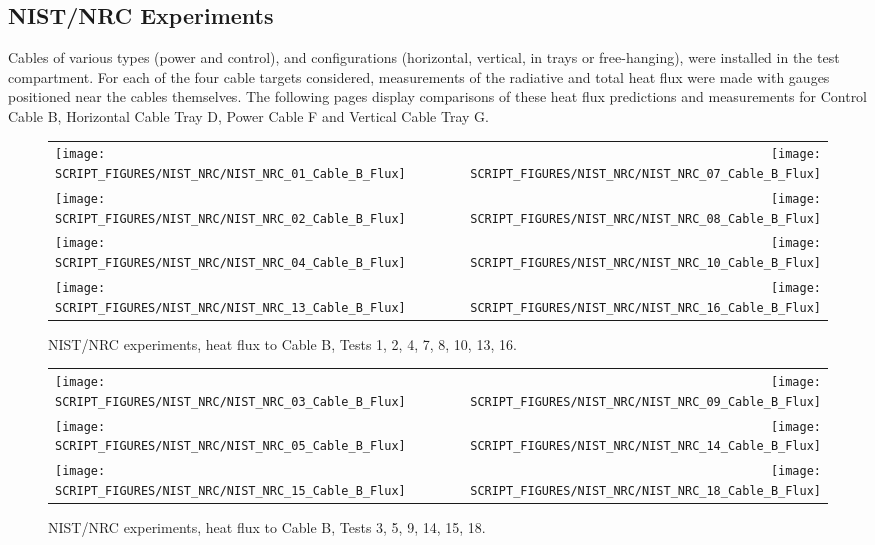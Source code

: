 \clearpage

\subsection{NIST/NRC Experiments}

Cables of various types (power and control), and configurations (horizontal, vertical, in trays or free-hanging), were installed in the test compartment. For each of the four cable targets considered, measurements of the radiative and total heat flux were made with gauges positioned near the cables themselves.  The following pages display comparisons of these heat flux predictions and measurements for Control Cable B, Horizontal Cable Tray D, Power Cable F and Vertical Cable Tray G.

\newpage

\begin{figure}[p]
\begin{tabular*}{\textwidth}{l@{\extracolsep{\fill}}r}
\texttt{[image: SCRIPT\_FIGURES/NIST\_NRC/NIST\_NRC\_01\_Cable\_B\_Flux]} &
\texttt{[image: SCRIPT\_FIGURES/NIST\_NRC/NIST\_NRC\_07\_Cable\_B\_Flux]} \\
\texttt{[image: SCRIPT\_FIGURES/NIST\_NRC/NIST\_NRC\_02\_Cable\_B\_Flux]} &
\texttt{[image: SCRIPT\_FIGURES/NIST\_NRC/NIST\_NRC\_08\_Cable\_B\_Flux]} \\
\texttt{[image: SCRIPT\_FIGURES/NIST\_NRC/NIST\_NRC\_04\_Cable\_B\_Flux]} &
\texttt{[image: SCRIPT\_FIGURES/NIST\_NRC/NIST\_NRC\_10\_Cable\_B\_Flux]} \\
\texttt{[image: SCRIPT\_FIGURES/NIST\_NRC/NIST\_NRC\_13\_Cable\_B\_Flux]} &
\texttt{[image: SCRIPT\_FIGURES/NIST\_NRC/NIST\_NRC\_16\_Cable\_B\_Flux]}
\end{tabular*}
\caption[NIST/NRC experiments, heat flux to Cable B, Tests 1, 2, 4, 7, 8, 10, 13, 16]
{NIST/NRC experiments, heat flux to Cable B, Tests 1, 2, 4, 7, 8, 10, 13, 16.}
\label{NIST_NRC_Cable_B_Flux_Closed}
\end{figure}

\begin{figure}[p]
\begin{tabular*}{\textwidth}{l@{\extracolsep{\fill}}r}
\texttt{[image: SCRIPT\_FIGURES/NIST\_NRC/NIST\_NRC\_03\_Cable\_B\_Flux]} &
\texttt{[image: SCRIPT\_FIGURES/NIST\_NRC/NIST\_NRC\_09\_Cable\_B\_Flux]} \\
\texttt{[image: SCRIPT\_FIGURES/NIST\_NRC/NIST\_NRC\_05\_Cable\_B\_Flux]} &
\texttt{[image: SCRIPT\_FIGURES/NIST\_NRC/NIST\_NRC\_14\_Cable\_B\_Flux]} \\
\texttt{[image: SCRIPT\_FIGURES/NIST\_NRC/NIST\_NRC\_15\_Cable\_B\_Flux]} &
\texttt{[image: SCRIPT\_FIGURES/NIST\_NRC/NIST\_NRC\_18\_Cable\_B\_Flux]}
\end{tabular*}
\caption[NIST/NRC experiments, heat flux to Cable B, Tests 3, 5, 9, 14, 15, 18]
{NIST/NRC experiments, heat flux to Cable B, Tests 3, 5, 9, 14, 15, 18.}
\label{NIST_NRC_Cable_B_Flux_Open}
\end{figure}

